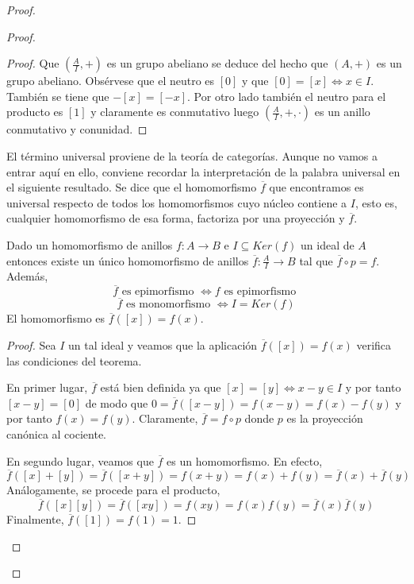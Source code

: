 \begin{proof}
\begin{proof}
\begin{proof}
	Que $(\frac{A}{I},+)$ es un grupo abeliano se deduce del hecho que $(A,+)$ es un grupo abeliano. Obsérvese que el neutro es $[0]$ y que $[0] = [x] \iff x \in I$. También se tiene que $-[x] = [-x]$.  Por otro lado también el neutro para el producto es $[1]$ y claramente es conmutativo luego $(\frac{A}{I},+,\cdot)$ es un anillo conmutativo y conunidad. 
\end{proof}

El término universal proviene de la teoría de categorías. Aunque no vamos a entrar aquí en ello, conviene recordar la interpretación de la palabra universal en el siguiente resultado. Se dice que el homomorfismo $\overline{f}$ que encontramos es universal respecto de todos los homomorfismos cuyo núcleo contiene a $I$, esto es, cualquier homomorfismo de esa forma, factoriza por una proyección y $\overline{f}$.

\begin{proposition}
	Dado un homomorfismo de anillos $f:A \to B$ e $I \subseteq Ker(f)$ un ideal de $A$ entonces existe un único homomorfismo de anillos $\overline{f}:\frac{A}{I} \to B$ tal que $\overline{f} \circ p = f$. Además, $$\overline{f} \text{ es epimorfismo } \iff f \text{ es epimorfismo }$$ $$\overline{f} \text{ es monomorfismo } \iff I = Ker(f)$$ El homomorfismo es $\overline{f}([x]) = f(x)$. 
	
\end{proposition}
\begin{proof}
	Sea $I$ un tal ideal y veamos que la aplicación $\overline{f}([x]) = f(x)$ verifica las condiciones del teorema. 
	
	En primer lugar, $\overline{f}$ está bien definida ya que $[x] = [y] \iff x-y \in I$ y por tanto $[x-y] = [0]$ de modo que $0 = \overline{f}([x-y]) = f(x-y) = f(x) - f(y) $ y por tanto $f(x) = f(y)$. Claramente, $\overline{f} = f \circ p$ donde $p$ es la proyección canónica al cociente.  
	
	En segundo lugar, veamos que $\overline{f}$ es un homomorfismo. En efecto, $$\overline{f}([x]+[y]) =\overline{f}([x+y]) = f(x+y) = f(x) + f(y) = \overline{f}(x) + \overline{f}(y)$$ Análogamente, se procede para el producto, $$\overline{f}([x][y]) =\overline{f}([xy]) = f(xy) = f(x)f(y) = \overline{f}(x)\overline{f}(y)$$ Finalmente, $\overline{f}([1]) = f(1) = 1$. 
	

\end{proof}
\end{proof}
\end{proof}
